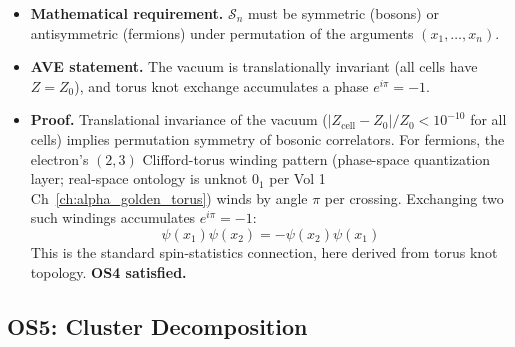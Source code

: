 \begin{itemize}
    \item \textbf{Mathematical requirement.}  $\mathcal{S}_n$ must be symmetric
          (bosons) or antisymmetric (fermions) under permutation of the
          arguments $(x_1,\ldots,x_n)$.
    \item \textbf{AVE statement.}  The vacuum is translationally invariant
          (all cells have $Z = Z_0$), and torus knot exchange accumulates
          a phase $e^{i\pi} = -1$.
    \item \textbf{Proof.}  Translational invariance of the vacuum
          ($|Z_\text{cell} - Z_0|/Z_0 < 10^{-10}$ for all cells) implies
          permutation symmetry of bosonic correlators.  For fermions, the
          electron's $(2,3)$ Clifford-torus winding pattern (phase-space
          quantization layer; real-space ontology is unknot $0_1$ per Vol 1
          Ch~\ref{ch:alpha_golden_torus}) winds by angle $\pi$ per crossing.
          Exchanging two such windings accumulates $e^{i\pi} = -1$:
          \begin{equation}
              \psi(x_1)\psi(x_2) = -\psi(x_2)\psi(x_1)
          \end{equation}
          This is the standard spin-statistics connection, here derived from
          torus knot topology.  \textbf{OS4 satisfied.}
\end{itemize}

\subsection{OS5: Cluster Decomposition}

